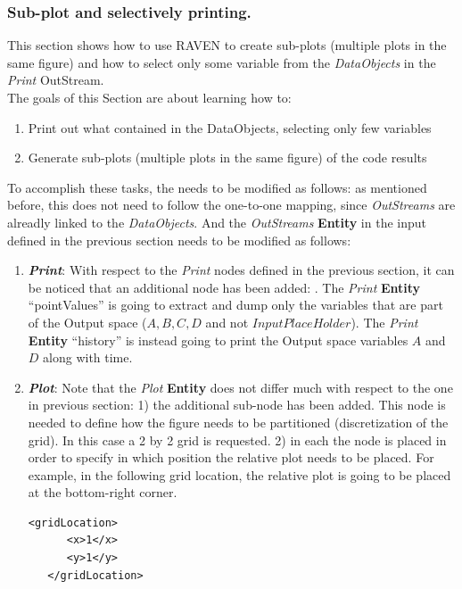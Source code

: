 \subsubsection{Sub-plot and selectively printing.}
This section shows how to use RAVEN to create sub-plots (multiple plots in the same figure) and
how to select only some variable from the \textit{DataObjects} in the \textit{Print} OutStream.
 \\ The goals of this Section are about learning how to:
 \begin{enumerate}
   \item Print out what contained in the DataObjects, selecting only few variables
   \item Generate sub-plots (multiple plots in the same figure) of the code results
\end{enumerate}

To accomplish these tasks, the  needs to be modified as follows:
\nb as mentioned before, this  does not need to follow the one-to-one mapping, since \textit{OutStreams}
are alreadly linked to the \textit{DataObjects}.
And the \textit{OutStreams} \textbf{Entity} in the input defined in the previous section needs to be modified as
follows:

\begin{enumerate}
   \item \textbf{\textit{Print}}:
   With respect to the \textit{Print} nodes defined in the previous section, it can
   be noticed that an additional node has been added: . The \textit{Print} \textbf{Entity}
   ``pointValues'' is going to extract and dump only the variables that are part of the Output space
   ($A,B,C,D$ and not $InputPlaceHolder$).  The \textit{Print} \textbf{Entity} ``history'' is instead going to print
   the Output space variables $A$ and $D$ along with time.

   \item \textbf{\textit{Plot}}:
 Note that the  \textit{Plot} \textbf{Entity} does not differ much with respect to the one in
 previous section: 1) the additional sub-node   has been added.
 This node is needed to define how the figure needs to be partitioned (discretization of the grid). In this case
 a 2 by 2 grid is requested. 2) in each  the node  is placed in
 order to specify in which position the relative plot needs to be placed. For example, in the following grid
 location, the relative plot is going to be placed at the bottom-right corner.
 \begin{lstlisting}[style=XML,morekeywords={arg,extension,pauseAtEnd,overwrite}]
   <gridLocation>
      <x>1</x>
      <y>1</y>
   </gridLocation>
  \end{lstlisting}
\end{enumerate}

